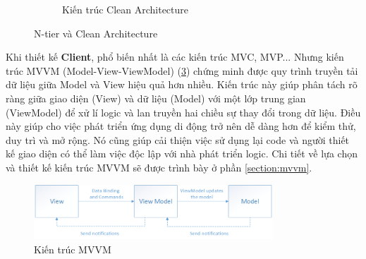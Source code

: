 \documentclass[../DoAn.tex]{subfiles}
\begin{document}
\begin{figure}[H]
\begin{subfigure}{0.49\textwidth}
        \caption{Kiến trúc Clean Architecture \cite{cleanarchitecturejasontaylor}}
        \label{fig:CleanArchitecture}
    \end{subfigure}
    \caption{N-tier và Clean Architecture}
    \label{fig:NtiervsCleanArchitecture}
\end{figure}

Khi thiết kế \textbf{Client}, phổ biến nhất là các kiến trúc MVC, MVP... Nhưng kiến trúc MVVM (Model-View-ViewModel) (\ref{fig:MVVMArchitecture}) chứng minh được quy trình truyền tải dữ liệu giữa Model và View hiệu quả hơn nhiều. Kiến trúc này giúp phân tách rõ ràng giữa giao diện (View) và dữ liệu (Model) với một lớp trung gian (ViewModel) để xử lí logic và lan truyền hai chiều sự thay đổi trong dữ liệu. Điều này giúp cho việc phát triển ứng dụng di động trở nên dễ dàng hơn để kiểm thử, duy trì và mở rộng. Nó cũng giúp cải thiện việc sử dụng lại code và người thiết kế giao diện có thể làm việc độc lập với nhà phát triển logic. Chi tiết về lựa chọn và thiết kế kiến trúc MVVM sẽ được trình bày ở phần \ref{section:mvvm}.
\begin{figure}[H]
    \centering
    \includegraphics[width=0.8\textwidth]{Hinhve/design/architecture/MVVM}
    \caption{Kiến trúc MVVM \cite{mvvmmicrosoft}}
    \label{fig:MVVMArchitecture}
\end{figure}
\break
\end{document}
